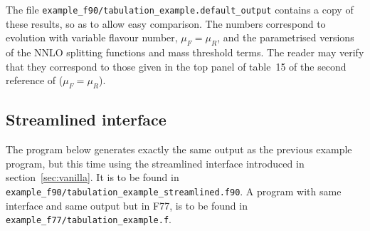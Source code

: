 \documentclass[12pt]{article}
\newcommand{\ttt}[1]{\texttt{#1}}
\begin{document}
\noindent The file
\ttt{example\_f90/tabulation\_example.default\_output} contains a copy
of these results, so as to allow easy comparison. The numbers
correspond to evolution with variable flavour number, $\mu_F = \mu_R$,
and the parametrised versions of the NNLO splitting functions and mass
threshold terms.
%
The reader may verify that they correspond to those given in the top
panel of table~15 of the second reference of \cite{Benchmarks} ($\mu_F
= \mu_R$).

\subsection{Streamlined interface}
\label{sec:stream-example}

The program below generates exactly the same output
as the previous example program, but this time
using the streamlined interface introduced
in section~\ref{sec:vanilla}. It is to be
found in
\ttt{example\_f90/tabulation\_example\_streamlined.f90}. 
A program with same interface and same output 
but in F77, is to be found in
\ttt{example\_f77/tabulation\_example.f}.
\end{document}
